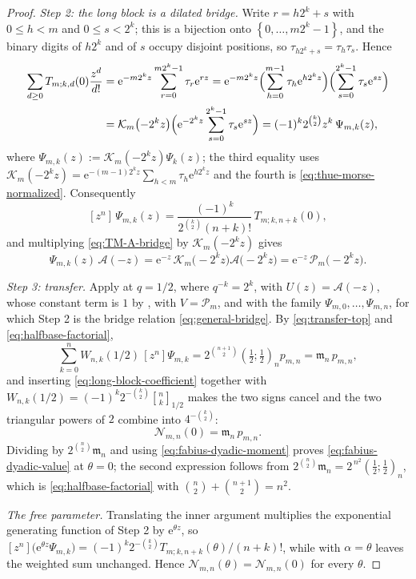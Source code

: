 \documentclass[11pt,oneside,openany]{book}
\theoremstyle{definition}
\theoremstyle{remark}
\newcommand{\Qbinom}[3]{\genfrac{[}{]}{0pt}{}{#1}{#2}_{#3}}
\newcommand{\e}{\mathrm e}
\newcommand{\set}[1]{\left\{#1\right\}}
\newcommand{\defeq}{\mathrel{:=}}
\begin{document}
\begin{proof}
\emph{Step 2: the long block is a dilated bridge.}  Write $r=h2^k+s$ with
$0\le h<m$ and $0\le s<2^k$; this is a bijection onto $\set{0,\ldots,m2^k-1}$, and the
binary digits of $h2^k$ and of $s$ occupy disjoint positions, so
$\tau_{h2^k+s}=\tau_h\tau_s$.  Hence
\begin{align*}
 \sum_{d\ge0}T_{m;k,d}(0)\frac{z^d}{d!}
 &=\e^{-m2^kz}\sum_{r=0}^{m2^k-1}\tau_r\e^{rz}
  =\e^{-m2^kz}
   \Bigl(\sum_{h=0}^{m-1}\tau_h\e^{h2^kz}\Bigr)
   \Bigl(\sum_{s=0}^{2^k-1}\tau_s\e^{sz}\Bigr)\\
 &=\mathcal K_m\bigl(-2^kz\bigr)
   \Bigl(\e^{-2^kz}\sum_{s=0}^{2^k-1}\tau_s\e^{sz}\Bigr)
  =(-1)^k2^{\binom k2}z^k\,\Psi_{m,k}(z),
\end{align*}
where $\Psi_{m,k}(z)\defeq\mathcal K_m(-2^kz)\Psi_k(z)$; the third equality uses
$\mathcal K_m(-2^kz)=\e^{-(m-1)2^kz}\sum_{h<m}\tau_h\e^{h2^kz}$ and the fourth is
\eqref{eq:thue-morse-normalized}.  Consequently
\begin{equation}\label{eq:long-block-coefficient}
 [z^n]\,\Psi_{m,k}(z)
 =\frac{(-1)^k}{2^{\binom k2}(n+k)!}\,T_{m;k,n+k}(0),
\end{equation}
and multiplying \eqref{eq:TM-A-bridge} by $\mathcal K_m(-2^kz)$ gives
\[
 \Psi_{m,k}(z)\,\mathcal A(-z)
 =\e^{-z}\,\mathcal K_m\bigl(-2^kz\bigr)\mathcal A\bigl(-2^kz\bigr)
 =\e^{-z}\,\mathcal P_m\bigl(-2^kz\bigr).
\]

\emph{Step 3: transfer.}  Apply  at $q=1/2$,
where $q^{-k}=2^k$, with $U(z)=\mathcal A(-z)$, whose constant term is $1$ by
, with $V=\mathcal P_m$, and with the family
$\Psi_{m,0},\ldots,\Psi_{m,n}$, for which Step 2 is the bridge relation
\eqref{eq:general-bridge}.  By \eqref{eq:transfer-top} and \eqref{eq:halfbase-factorial},
\[
 \sum_{k=0}^{n}W_{n,k}(1/2)\,[z^n]\Psi_{m,k}
 =2^{\binom{n+1}{2}}\left(\tfrac12;\tfrac12\right)_np_{m,n}
 =\mathfrak m_n\,p_{m,n},
\]
and inserting \eqref{eq:long-block-coefficient} together with
$W_{n,k}(1/2)=(-1)^k2^{-\binom k2}\Qbinom nk{1/2}$ makes the two signs cancel and the
two triangular powers of $2$ combine into $4^{-\binom k2}$:
\[
 \mathcal N_{m,n}(0)=\mathfrak m_n\,p_{m,n}.
\]
Dividing by $2^{\binom n2}\mathfrak m_n$ and using \eqref{eq:fabius-dyadic-moment}
proves \eqref{eq:fabius-dyadic-value} at $\theta=0$; the second expression follows from
$2^{\binom n2}\mathfrak m_n=2^{\,n^2}\left(\tfrac12;\tfrac12\right)_n$, which is
\eqref{eq:halfbase-factorial} with $\binom n2+\binom{n+1}{2}=n^2$.

\emph{The free parameter.}  Translating the inner argument multiplies the exponential
generating function of Step 2 by $\e^{\theta z}$, so
$[z^n]\bigl(\e^{\theta z}\Psi_{m,k}\bigr)
 =(-1)^k2^{-\binom k2}T_{m;k,n+k}(\theta)/(n+k)!$, while
 with $\alpha=\theta$ leaves the weighted sum
unchanged.  Hence $\mathcal N_{m,n}(\theta)=\mathcal N_{m,n}(0)$ for every $\theta$.


\end{proof}
\end{document}
